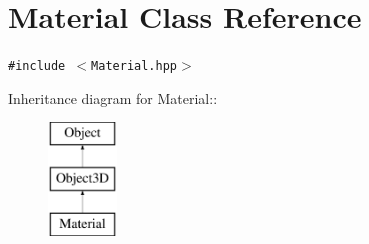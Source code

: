 \hypertarget{classm3g_1_1Material}{
\section{Material Class Reference}
\label{classm3g_1_1Material}
}
{\tt \#include $<$Material.hpp$>$}

Inheritance diagram for Material::\begin{figure}[H]
\begin{center}
\leavevmode
\includegraphics[height=3cm]{classm3g_1_1Material}
\end{center}
\end{figure}
